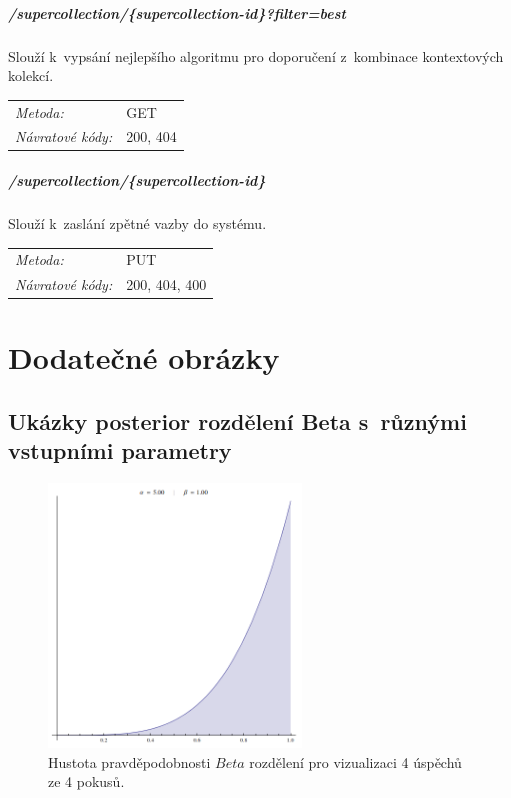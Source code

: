 \documentclass[thesis=M,czech]{FITthesis}[2014/05/07]
\begin{document}
\paragraph*{/supercollection/\{supercollection-id\}?filter=best}

Slouží k~vypsání nejlepšího algoritmu pro doporučení z~kombinace kontextových kolekcí.

\begin{center}
 	\begin{tabular}{lp{10cm}}
 		\textit{Metoda:}		& GET			\tabularnewline 
 		\textit{Návratové kódy:}		& 200, 404			\tabularnewline 		
 	\end{tabular}	
\end{center} 

\paragraph*{/supercollection/\{supercollection-id\}}

Slouží k~zaslání zpětné vazby do systému.

\begin{center}
 	\begin{tabular}{lp{10cm}}
 		\textit{Metoda:}		& PUT			\tabularnewline 
 		\textit{Návratové kódy:}		& 200, 404, 400			\tabularnewline 		
 	\end{tabular}	
\end{center} 

\chapter{Dodatečné obrázky}
\section{Ukázky posterior rozdělení Beta s~různými vstupními parametry}

\begin{figure}\centering
	\includegraphics[width=0.6\textwidth]{obr/beta1.png}
 	\caption[Hustota pravděpodobnosti $Beta$ rozdělení pro vizualizaci 4 úspěchů ze 4 pokusů.]{Hustota pravděpodobnosti $Beta$ rozdělení pro vizualizaci 4 úspěchů ze 4 pokusů.}\label{fig:beta1}
\end{figure}	
\end{document}
